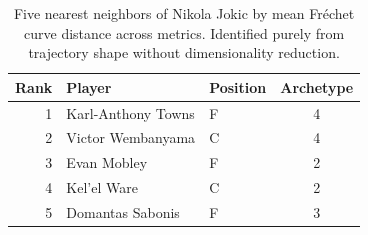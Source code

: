 \begin{table}[htbp]
  \centering\small
  \begin{tabular}{rllc}
    \toprule
    Rank & Player & Position & Archetype \\
    \midrule
    1 & Karl-Anthony Towns & F & 4 \\
    2 & Victor Wembanyama & C & 4 \\
    3 & Evan Mobley & F & 2 \\
    4 & Kel'el Ware & C & 2 \\
    5 & Domantas Sabonis & F & 3 \\
    \bottomrule
  \end{tabular}
  \caption{Five nearest neighbors of Nikola Jokic by mean Fr\'{e}chet curve distance across metrics. Identified purely from trajectory shape without dimensionality reduction.}
  \label{tab:Nikola_Jokic_frechet_curve_neighbors}
\end{table}

